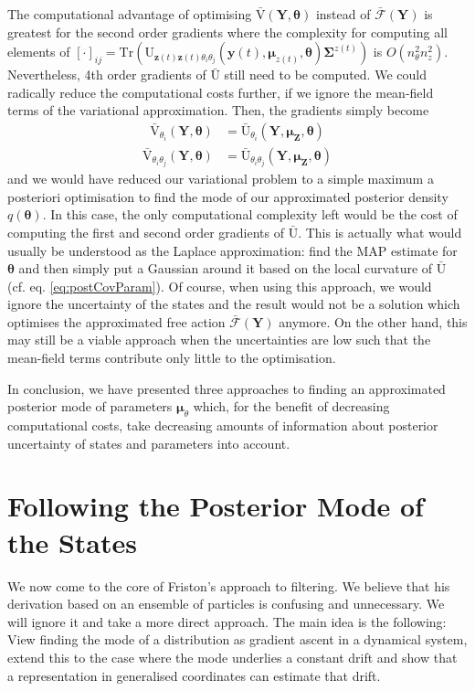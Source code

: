 \documentclass[a4paper,10pt]{article}
\newcommand{\bs}[1]{\mathbf{#1}}					%
\newcommand{\bgs}[1]{\boldsymbol{#1}}				%
\newcommand{\trace}[1]{\mathrm{Tr}\left(#1\right)}					%
\renewcommand{\ss}{z}         %
\newcommand{\so}{y}         %
\renewcommand{\sp}{\theta}    %
\newcommand{\ps}{\bs{\ss}}    %
\newcommand{\po}{\bs{\so}}    %
\newcommand{\pp}{\bgs{\sp}} %
\newcommand{\Ps}{\bs{Z}}    %
\newcommand{\Po}{\bs{Y}}    %
\newcommand{\U}{\mathrm{U}}			%
\newcommand{\Ua}{\bar{\mathrm{U}}}		%
\newcommand{\Va}{\bar{\mathrm{V}}}		%
\newcommand{\Fa}{\bar{\mathcal{F}}}		%
\newcommand{\Cov}{\bgs{\Sigma}}			%
\begin{document}
The computational advantage of optimising $\Va(\Po,\pp)$ instead of $\Fa(\Po)$ is greatest for the second order gradients where the complexity for computing all elements of $[\cdot]_{ij} = \trace{\U_{\ps(t)\ps(t)\sp_i\sp_j}(\po(t),\bgs{\mu}_{\ss(t)},\pp)\Cov^{\ss(t)}}$ is $O(n_\sp^2n_\ss^2)$. Nevertheless, 4th order gradients of $\Ua$ still need to be computed. We could radically reduce the computational costs further, if we ignore the mean-field terms of the variational approximation. Then, the gradients simply become
\begin{align}
    \Va_{\sp_i}(\Po,\pp) &= \Ua_{\sp_i}(\Po,\bgs{\mu}_\Ps,\pp)
\end{align}
\begin{align}
    \Va_{\sp_i\sp_j}(\Po,\pp) &= \Ua_{\sp_i\sp_j}(\Po,\bgs{\mu}_\Ps,\pp)
\end{align}
and we would have reduced our variational problem to a simple maximum a posteriori optimisation to find the mode of our approximated posterior density $q(\pp)$. In this case, the only computational complexity left would be the cost of computing the first and second order gradients of $\Ua$. This is actually what would usually be understood as the Laplace approximation: find the MAP estimate for $\pp$ and then simply put a Gaussian around it based on the local curvature of $\Ua$ (cf. eq. \eqref{eq:postCovParam}). Of course, when using this approach, we would ignore the uncertainty of the states and the result would not be a solution which optimises the approximated free action $\Fa(\Po)$ anymore. On the other hand, this may still be a viable approach when the uncertainties are low such that the mean-field terms contribute only little to the optimisation.

In conclusion, we have presented three approaches to finding an approximated posterior mode of parameters $\bgs{\mu}_\sp$ which, for the benefit of decreasing computational costs, take decreasing amounts of information about posterior uncertainty of states and parameters into account.


\section{Following the Posterior Mode of the States}
\label{sec:filtering}
We now come to the core of Friston's approach to filtering. We believe that his derivation based on an ensemble of particles is confusing and unnecessary. We will ignore it and take a more direct approach. The main idea is the following: View finding the mode of a distribution as gradient ascent in a dynamical system, extend this to the case where the mode underlies a constant drift and show that a representation in generalised coordinates can estimate that drift.
\end{document}
